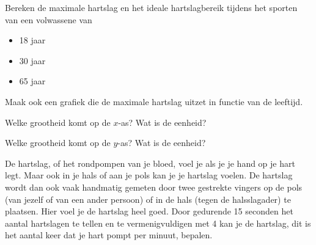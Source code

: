 \begin{oef}
Bereken de maximale hartslag en het ideale hartslagbereik tijdens het sporten van een volwassene van 
\begin{itemize}
	\item 18 jaar
	\item 30 jaar
	\item 65 jaar
\end{itemize}
\end{oef}

\begin{oef}Maak ook een grafiek die de maximale hartslag uitzet in functie van de leeftijd. 

Welke grootheid komt op de $x$-as? Wat is de eenheid? 

Welke grootheid komt op de $y$-as? Wat is de eenheid?
\end{oef}

De hartslag, of het rondpompen van je bloed, voel je als je je hand op je hart legt. Maar ook in je hals of aan je pols kan je je hartslag voelen. De hartslag wordt dan ook vaak handmatig gemeten door twee gestrekte vingers op de pols (van jezelf of van een ander persoon) of in de hals (tegen de halsslagader) te plaatsen. Hier voel je de hartslag heel goed. Door gedurende 15 seconden het aantal hartslagen te tellen en te vermenigvuldigen met 4 kan je de hartslag, dit is het aantal keer dat je hart pompt per minuut, bepalen.

